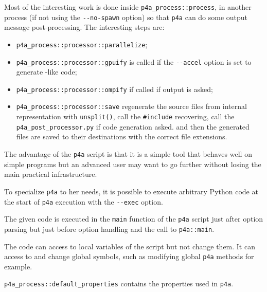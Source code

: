 \documentclass[a4paper]{article}
\begin{document}
Most of the interesting work is done inside \verb|p4a_process::process|,
in another process (if not using the \verb|--no-spawn| option) so that
\texttt{p4a} can do some \Apips output message post-processing. The
interesting steps are:
\begin{itemize}
\item \verb|p4a_process::processor::parallelize|;
\item \verb|p4a_process::processor::gpuify| is called if the
  \verb|--accel| option is set to generate \Agpu-like code;
\item \verb|p4a_process::processor::ompify| if called if \Aopenmp output
  is asked;
\item \verb|p4a_process::processor::save| regenerate the source files from
  \Apips internal representation with \verb|unsplit()|, call the
  \verb|#include| recovering, call the \verb|p4a_post_processor.py| if
  \Agpu code generation asked. and then the generated files are saved to
  their destinations with the correct file extensions.
\end{itemize}

The advantage of the \texttt{p4a} script is that it is a simple tool that
behaves well on simple programs but an advanced user may want to go
further without losing the main practical infrastructure.

To specialize \texttt{p4a} to her needs, it is possible to execute
arbitrary Python code at the start of \texttt{p4a} execution with the
\verb|--exec| option.

The given code is executed in the \verb|main| function of the \verb|p4a|
script just after option parsing but just before option handling and the
call to \verb|p4a::main|.

The code can access to local variables of the script but not change
them. It can access to and change global symbols, such as modifying global
\texttt{p4a} methods for example.

\verb|p4a_process::default_properties| contains the \Apips properties used
in \texttt{p4a}.

\end{document}
